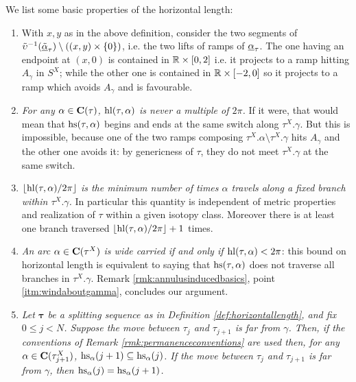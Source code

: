 We list some basic properties of the horizontal length:
\begin{enumerate}
\item With $x,y$ as in the above definition, consider the two segments of $\tilde\upsilon^{-1}(\underline{\tilde\alpha}_\tau)\setminus \left((x,y)\times\{0\}\right)$, i.e. the two lifts of ramps of $\underline{\alpha}_\tau$. The one having an endpoint at $(x,0)$ is contained in $\mathbb R\times[0,2]$ i.e. it projects to a ramp hitting $A_\gamma$ in $S^X$; while the other one is contained in $\mathbb R\times[-2,0]$ so it projects to a ramp which avoids $A_\gamma$ and is favourable.

\item \textit{For any $\alpha\in\mathbf C(\tau)$, $\mathrm{hl}(\tau,\alpha)$ is never a multiple of $2\pi$.} If it were, that would mean that $\mathrm{hs}(\tau,\alpha)$ begins and ends at the same switch along $\tau^X.\gamma$. But this is impossible, because one of the two ramps composing $\tau^X.\alpha\setminus\tau^X.\gamma$ hits $A_\gamma$ and the other one avoids it: by genericness of $\tau$, they do not meet $\tau^X.\gamma$ at the same switch.

\item\label{itm:hl_vs_multiplicity} \textit{$\lfloor \mathrm{hl}(\tau,\alpha)/2\pi\rfloor$ is the minimum number of times $\alpha$ travels along a fixed branch within $\tau^X.\gamma$.} In particular this quantity is independent of metric properties and realization of $\tau$ within a given isotopy class. Moreover there is at least one branch traversed $\lfloor \mathrm{hl}(\tau,\alpha)/2\pi\rfloor+1$ times.

\item\label{itm:hlvertex} \textit{An arc $\alpha\in\mathbf C(\tau^X)$ is wide carried if and only if $\mathrm{hl}(\tau,\alpha)<2\pi$}: this bound on horizontal length is equivalent to saying that $\mathrm{hs}(\tau,\alpha)$ does not traverse all branches in $\tau^X.\gamma$. Remark \ref{rmk:annulusinducedbasics}, point \ref{itm:windaboutgamma}, concludes our argument.

\item\label{itm:farisininfluent} \textit{Let $\bm\tau$ be a splitting sequence as in Definition \ref{def:horizontallength}, and fix $0\leq j<N$. Suppose the move between $\tau_j$ and $\tau_{j+1}$ is far from $\gamma$. Then, if the conventions of Remark \ref{rmk:permanenceconventions} are used then, for any $\alpha\in\mathbf C(\tau_{j+1}^X)$, $\mathrm{hs}_\alpha(j+1)\subseteq \mathrm{hs}_\alpha(j)$. If the move between $\tau_j$ and $\tau_{j+1}$ is far from $\gamma$, then $\mathrm{hs}_\alpha(j)=\mathrm{hs}_\alpha(j+1)$.}


\end{enumerate}
